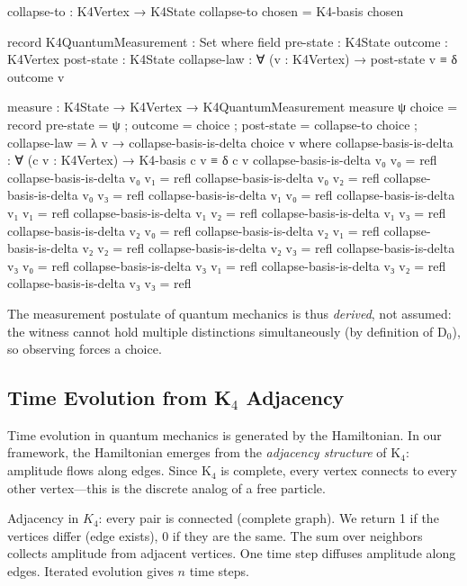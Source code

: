 \documentclass[11pt,a4paper]{book}
\begin{document}
\begin{code}
collapse-to : K4Vertex → K4State
collapse-to chosen = K4-basis chosen

record K4QuantumMeasurement : Set where
  field
    pre-state     : K4State
    outcome       : K4Vertex
    post-state    : K4State
    collapse-law  : ∀ (v : K4Vertex) → post-state v ≡ δ outcome v

measure : K4State → K4Vertex → K4QuantumMeasurement
measure ψ choice = record
  { pre-state    = ψ
  ; outcome      = choice
  ; post-state   = collapse-to choice
  ; collapse-law = λ v → collapse-basis-is-delta choice v
  }
  where
    collapse-basis-is-delta : ∀ (c v : K4Vertex) → K4-basis c v ≡ δ c v
    collapse-basis-is-delta v₀ v₀ = refl
    collapse-basis-is-delta v₀ v₁ = refl
    collapse-basis-is-delta v₀ v₂ = refl
    collapse-basis-is-delta v₀ v₃ = refl
    collapse-basis-is-delta v₁ v₀ = refl
    collapse-basis-is-delta v₁ v₁ = refl
    collapse-basis-is-delta v₁ v₂ = refl
    collapse-basis-is-delta v₁ v₃ = refl
    collapse-basis-is-delta v₂ v₀ = refl
    collapse-basis-is-delta v₂ v₁ = refl
    collapse-basis-is-delta v₂ v₂ = refl
    collapse-basis-is-delta v₂ v₃ = refl
    collapse-basis-is-delta v₃ v₀ = refl
    collapse-basis-is-delta v₃ v₁ = refl
    collapse-basis-is-delta v₃ v₂ = refl
    collapse-basis-is-delta v₃ v₃ = refl
\end{code}

The measurement postulate of quantum mechanics is thus \emph{derived}, not 
assumed: the witness cannot hold multiple distinctions simultaneously 
(by definition of D$_0$), so observing forces a choice.

\subsection{Time Evolution from K$_4$ Adjacency}

Time evolution in quantum mechanics is generated by the Hamiltonian. In our
framework, the Hamiltonian emerges from the \emph{adjacency structure} of K$_4$:
amplitude flows along edges. Since K$_4$ is complete, every vertex connects
to every other vertex---this is the discrete analog of a free particle.

Adjacency in $K_4$: every pair is connected (complete graph). We return 1 if the vertices differ (edge exists), 0 if they are the same. The sum over neighbors collects amplitude from adjacent vertices. One time step diffuses amplitude along edges. Iterated evolution gives $n$ time steps.
\end{document}
